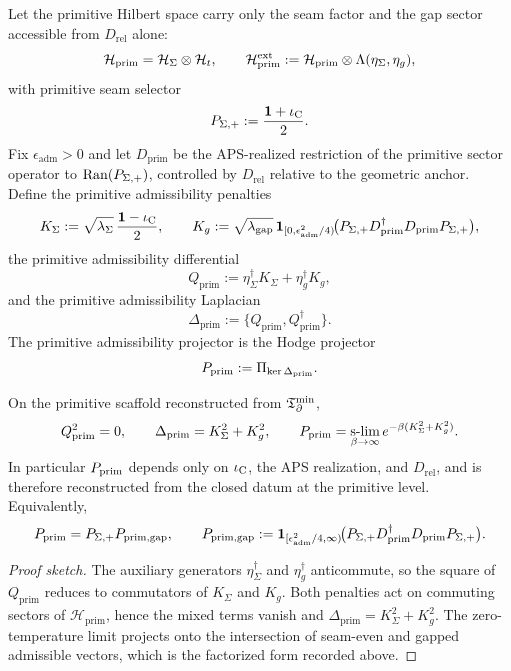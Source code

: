 \begin{definition}
\label{def:admissibility-complex}
\label{def:primitive-admissibility-complex}
Let the primitive Hilbert space carry only the seam factor and the gap sector accessible from
$D_{\mathrm{rel}}$ alone:
\[
\mathcal H_{\mathrm{prim}}=\mathcal H_{\Sigma}\otimes\mathcal H_t,
\qquad
\mathcal H_{\mathrm{prim}}^{\mathrm{ext}}
:=
\mathcal H_{\mathrm{prim}}\otimes\Lambda(\eta_\Sigma,\eta_g),
\]
with primitive seam selector
\[
P_{\Sigma,+}:=\frac{\mathbf 1+\iota_{\mathrm C}}{2}.
\]
Fix $\epsilon_{\mathrm{adm}}>0$ and let $D_{\mathrm{prim}}$ be the APS-realized restriction of
the primitive sector operator to $\mathrm{Ran}(P_{\Sigma,+})$, controlled by $D_{\mathrm{rel}}$
relative to the geometric anchor. Define the primitive admissibility penalties
\[
K_\Sigma:=\sqrt{\lambda_\Sigma}\,\frac{\mathbf 1-\iota_{\mathrm C}}{2},
\qquad
K_g:=\sqrt{\lambda_{\mathrm{gap}}}\,
\mathbf 1_{[0,\epsilon_{\mathrm{adm}}^2/4)}\!
\bigl(P_{\Sigma,+}D_{\mathrm{prim}}^\dagger D_{\mathrm{prim}}P_{\Sigma,+}\bigr),
\]
the primitive admissibility differential
\[
Q_{\mathrm{prim}}
:=
\eta_\Sigma^\dagger K_\Sigma
+\eta_g^\dagger K_g,
\]
and the primitive admissibility Laplacian
\[
\Delta_{\mathrm{prim}}:=\{Q_{\mathrm{prim}},Q_{\mathrm{prim}}^\dagger\}.
\]
The primitive admissibility projector is the Hodge projector
\[
P_{\mathrm{prim}}
:=
\Pi_{\ker\Delta_{\mathrm{prim}}}.
\]
\end{definition}

\begin{lemma}
\label{lem:admissibility-nilpotency}
\label{lem:hodge-admissibility-projector}
\label{lem:primitive-admissibility-nilpotency}
On the primitive scaffold reconstructed from $\mathfrak T_{\partial}^{\min}$,
\[
Q_{\mathrm{prim}}^2=0,
\qquad
\Delta_{\mathrm{prim}}
=
K_\Sigma^2+K_g^2,
\qquad
P_{\mathrm{prim}}
=
\operatorname*{s-lim}_{\beta\to\infty}e^{-\beta(K_\Sigma^2+K_g^2)}.
\]
In particular $P_{\mathrm{prim}}$ depends only on $\iota_{\mathrm C}$, the APS realization, and $D_{\mathrm{rel}}$, and
is therefore reconstructed from the closed datum at the primitive level. Equivalently,
\[
P_{\mathrm{prim}}=P_{\Sigma,+}P_{\mathrm{prim,gap}},
\qquad
P_{\mathrm{prim,gap}}
:=
\mathbf 1_{[\epsilon_{\mathrm{adm}}^2/4,\infty)}
\!\bigl(P_{\Sigma,+}D_{\mathrm{prim}}^\dagger D_{\mathrm{prim}}P_{\Sigma,+}\bigr).
\]
\end{lemma}

\begin{proof}[Proof sketch]
The auxiliary generators $\eta_\Sigma^\dagger$ and $\eta_g^\dagger$ anticommute, so the square
of $Q_{\mathrm{prim}}$ reduces to commutators of $K_\Sigma$ and $K_g$. Both penalties act on
commuting sectors of $\mathcal H_{\mathrm{prim}}$, hence the mixed terms vanish and
$\Delta_{\mathrm{prim}}=K_\Sigma^2+K_g^2$. The zero-temperature limit projects onto the
intersection of seam-even and gapped admissible vectors, which is the factorized form recorded
above.
\end{proof}

